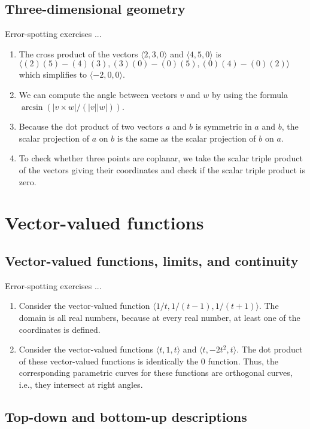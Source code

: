 \documentclass[10pt]{amsart}
\begin{document}
\subsection{Three-dimensional geometry}

Error-spotting exercises ...

\begin{enumerate}
\item The cross product of the vectors $\langle 2,3,0 \rangle$ and
  $\langle 4,5,0 \rangle$ is $\langle (2)(5) - (4)(3), (3)(0) -
  (0)(5), (0)(4) - (0)(2) \rangle$ which simplifies to $\langle -2,0,0
  \rangle$.
\item We can compute the angle between vectors $v$ and $w$ by using
  the formula $\arcsin(|v \times w|/(|v||w|))$.
\item Because the dot product of two vectors $a$ and $b$ is symmetric
  in $a$ and $b$, the scalar projection of $a$ on $b$ is the same as
  the scalar projection of $b$ on $a$.
\item To check whether three points are coplanar, we take the scalar
  triple product of the vectors giving their coordinates and check if
  the scalar triple product is zero.
\end{enumerate}
\section{Vector-valued functions}

\subsection{Vector-valued functions, limits, and continuity}

Error-spotting exercises ...

\begin{enumerate}
\item Consider the vector-valued function $\langle 1/t, 1/(t - 1),
  1/(t + 1) \rangle$. The domain is all real numbers, because at every
  real number, at least one of the coordinates is defined.
\item Consider the vector-valued functions $\langle t,1,t \rangle$ and
  $\langle t,-2t^2,t \rangle$. The dot product of these vector-valued
  functions is identically the $0$ function. Thus, the corresponding
  parametric curves for these functions are orthogonal curves, i.e.,
  they intersect at right angles.
\end{enumerate}

\subsection{Top-down and bottom-up descriptions}
\end{document}
